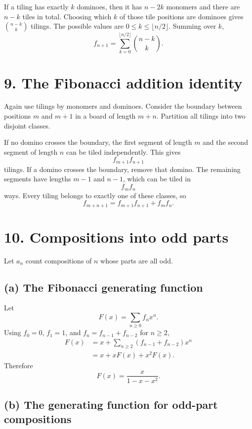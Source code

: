 \documentclass[11pt]{article}
\begin{document}
If a tiling has exactly \(k\) dominoes, then it has \(n-2k\) monomers and
there are \(n-k\) tiles in total. Choosing which \(k\) of those tile positions
are dominoes gives \(\binom{n-k}{k}\) tilings. The possible values are
\(0\leq k\leq\lfloor n/2\rfloor\). Summing over \(k\),
\[
    \boxed{f_{n+1}=\sum_{k=0}^{\lfloor n/2\rfloor}
    \binom{n-k}{k}}.
\]

\section*{9. The Fibonacci addition identity}

Again use tilings by monomers and dominoes. Consider the boundary between
positions \(m\) and \(m+1\) in a board of length \(m+n\). Partition all tilings
into two disjoint classes.

If no domino crosses the boundary, the first segment of length \(m\) and the
second segment of length \(n\) can be tiled independently. This gives
\[
    f_{m+1}f_{n+1}
\]
tilings. If a domino crosses the boundary, remove that domino. The remaining
segments have lengths \(m-1\) and \(n-1\), which can be tiled in
\[
    f_m f_n
\]
ways. Every tiling belongs to exactly one of these classes, so
\[
    \boxed{f_{m+n+1}=f_{m+1}f_{n+1}+f_mf_n}.
\]

\section*{10. Compositions into odd parts}

Let \(a_n\) count compositions of \(n\) whose parts are all odd.

\subsection*{(a) The Fibonacci generating function}

Let
\[
    F(x)=\sum_{n\geq 0}f_nx^n.
\]
Using \(f_0=0\), \(f_1=1\), and \(f_n=f_{n-1}+f_{n-2}\) for \(n\geq2\),
\begin{align*}
    F(x)
    &=x+\sum_{n\geq2}(f_{n-1}+f_{n-2})x^n\\
    &=x+xF(x)+x^2F(x).
\end{align*}
Therefore
\[
    \boxed{F(x)=\frac{x}{1-x-x^2}}.
\]

\subsection*{(b) The generating function for odd-part compositions}
\end{document}

